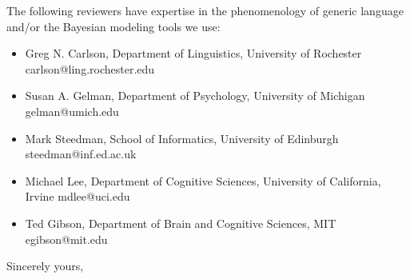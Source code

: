 \documentclass[11pt,letterpaper]{letter} %
\begin{document}
\begin{letter}
The following reviewers have expertise in the phenomenology of generic language and/or the Bayesian modeling tools we use:

\begin{itemize}
\item Greg N. Carlson, Department of Linguistics, University of Rochester carlson@ling.rochester.edu
\item Susan A. Gelman, Department of Psychology, University of Michigan gelman@umich.edu
\item Mark Steedman, School of Informatics, University of Edinburgh  steedman@inf.ed.ac.uk
\item Michael Lee, Department of Cognitive Sciences, University of California, Irvine mdlee@uci.edu
\item Ted Gibson, Department of Brain and Cognitive Sciences, MIT egibson@mit.edu
\end{itemize}



\closing{Sincerely yours,}


\end{letter}
\end{document}
